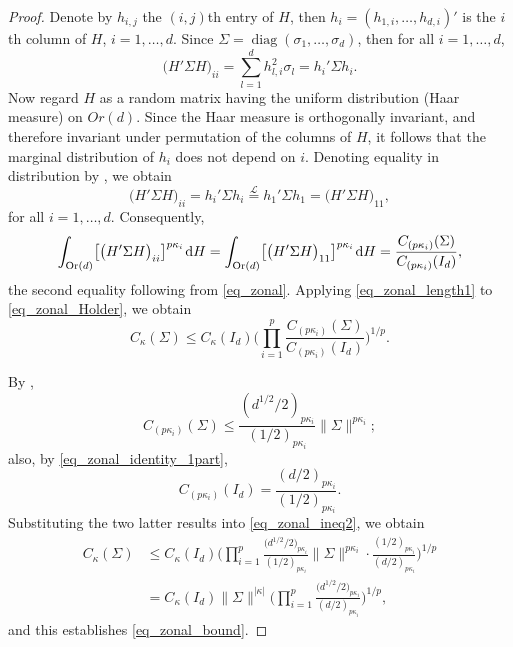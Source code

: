 \documentclass[11pt]{article}
\numberwithin{equation}{section}
\numberwithin{equation}{section}
\def\dd {\hskip1pt\mathrm{d}}
\def\diag{\mathop{\mathrm{diag}}}
\def\Or{\mathop{\mathrm{Or}}}
\newcommand{\eqdist}{\overset{\mathcal{L}}{=}}
\begin{document}
\begin{proof}
Denote by $h_{i,j}$ the $(i,j)$th entry of $H$, then $h_i = (h_{1,i},\ldots,h_{d,i})'$ is the $i$th column of $H$, $i=1,\ldots,d$. Since $\Sigma = \diag(\sigma_1,\ldots,\sigma_d)$, then for all $i=1,\ldots,d$,
\[
\bigl(H'\Sigma H\bigr)_{ii} = \sum_{l=1}^d h_{l,i}^2 \sigma_l = h_i'\Sigma h_i.
\]
Now regard $H$ as a random matrix having the uniform distribution (Haar measure) on $Or(d)$. Since the Haar measure is orthogonally invariant, and therefore invariant under permutation of the columns of $H$, it follows that the marginal distribution of $h_i$ does not depend on $i$. Denoting equality in distribution by \smash{$\eqdist$}, we obtain
\[
\bigl(H'\Sigma H\bigr)_{ii} = h_i'\Sigma h_i \eqdist h_1'\Sigma h_1 = \bigl(H'\Sigma H\bigr)_{11},
\]
for all $i=1,\ldots,d$. Consequently,
\begin{equation}
\label{eq_zonal_length1}
\int_{\Or(d)} \bigl[\bigl(H'\Sigma H\bigr)_{ii}\bigr]^{p \kappa_i} \dd H = \int_{\Or(d)} \bigl[\bigl(H'\Sigma H\bigr)_{11}\bigr]^{p \kappa_i} \dd H = \frac{C_{(p \kappa_i)}(\Sigma)}{C_{(p \kappa_i)}(I_d)},
\end{equation}
the second equality following from \eqref{eq_zonal}. Applying \eqref{eq_zonal_length1} to \eqref{eq_zonal_Holder}, we obtain
\begin{equation}
\label{eq_zonal_ineq2}
C_\kappa(\Sigma) \le C_\kappa(I_d) \Bigg(\prod_{i=1}^p \frac{C_{(p \kappa_i)}(\Sigma)}{C_{(p \kappa_i)}(I_d)}\Bigg)^{1/p}.
\end{equation}

By \cite[equation~(A.10)]{BagyanRichards},
\[
C_{(p \kappa_i)}(\Sigma) \le \frac{(d^{1/2}/2)_{p \kappa_i}}{(1/2)_{p \kappa_i}} \|\Sigma\|^{p \kappa_i};
\]
also, by \eqref{eq_zonal_identity_1part},
\[
C_{(p \kappa_i)}(I_d) = \frac{(d/2)_{p \kappa_i}}{(1/2)_{p \kappa_i}}.
\]
Substituting the two latter results into \eqref{eq_zonal_ineq2}, we obtain
\begin{align*}
C_\kappa(\Sigma) &\le C_\kappa(I_d) \Bigg(\prod_{i=1}^p \frac{\bigl(d^{1/2}/2\bigr)_{p \kappa_i}}{(1/2)_{p \kappa_i}} \|\Sigma\|^{p \kappa_i} \cdot \frac{(1/2)_{p \kappa_i}}{(d/2)_{p \kappa_i}}\Bigg)^{1/p} \\
&= C_\kappa(I_d) \|\Sigma\|^{|\kappa|} \Bigg(\prod_{i=1}^p \frac{\bigl(d^{1/2}/2\bigr)_{p \kappa_i}}{(d/2)_{p \kappa_i}}\Bigg)^{1/p},
\end{align*}
and this establishes \eqref{eq_zonal_bound}.
\end{proof}

\setcounter{subsection}{2}\setcounter{equation}{32}
\end{document}

